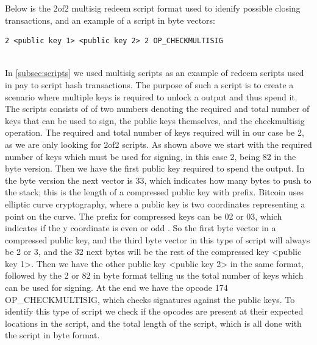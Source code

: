 
Below is the 2of2 multisig redeem script format used to idenify possible closing transactions, and an example of a script in byte vectors:
\begin{verbatim}
2 <public key 1> <public key 2> 2 OP_CHECKMULTISIG
\end{verbatim}

\noindent [82 33 2 211 153 245 240 225 125 95 140 116 20 99 81 38 139 135 136 59 14 125 34 181 148 47 67 16 42 24 147 28 144 61 33 33 2 215 1 70 141 233 112 91 253 252 202 27 73 158 254 234 159 125 98 30 78 159 235 6 46 167 103 105 239 180 125 168 66 82 174]
\\

In \cref{subsec:scripts} we used multisig scripts as an example of redeem scripts used in pay to script hash transactions. The purpose of such a script is to create a scenario where multiple keys is required to unlock a output and thus spend it.
The scripts consists of of two numbers denoting the required and total number of keys that can be used to sign, the public keys themselves, and the checkmultisig operation. The required and total number of keys required will in our case be 2, as we are only looking for 2of2 scripts.
As shown above we start with the required number of keys which must be used for signing, in this case 2, being 82 in the byte version. Then we have the first public key required to spend the output. In the byte version the next vector is 33, which indicates how many bytes to push to the stack; this is the length of a compressed public key with prefix. Bitcoin uses elliptic curve cryptography, where a public key is two coordinates representing a point on the curve. The prefix for compressed keys can be 02 or 03, which indicates if the y coordinate is even or odd \cite{antonopoulos2017mastering}. So the first byte vector in a compressed public key, and the third byte vector in this type of script will always be 2 or 3, and the 32 next bytes will be the rest of the compressed key <public key 1>. Then we have the other public key <public key 2> in the same format, followed by the 2 or 82 in byte format telling us the total number of keys which can be used for signing. At the end we have the opcode 174 OP\_CHECKMULTISIG, which checks signatures against the public keys. To identify this type of script we check if the opcodes are present at their expected locations in the script, and the total length of the script, which is all done with the script in byte format.
\\

